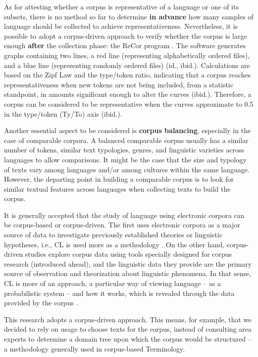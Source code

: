 \documentclass[english]{textolivre}
\begin{document}
As for attesting whether a corpus is representative of a language or one of its subsets, there is no method so far to determine \textbf{in advance} how many samples of language should be collected to achieve representativeness. Nevertheless, it is possible to adopt a corpus-driven approach to verify whether the corpus is large enough \textbf{after} the collection phase: the ReCor program \cite{seghiri_too_2014}. The software generates graphs containing two lines, a red line (representing alphabetically ordered files), and a blue line (representing randomly ordered files) (id., ibid.). Calculations are based on the Zipf Law and the type/token ratio, indicating that a corpus reaches representativeness when new tokens are not being included, from a statistic standpoint, in amounts significant enough to alter the curves (ibid.). Therefore, a corpus can be considered to be representative when the curves approximate to 0.5 in the type/token (Ty/To) axis (ibid.).

Another essential aspect to be considered is \textbf{corpus balancing}, especially in the case of comparable corpora. A balanced comparable corpus usually has a similar number of tokens, similar text typologies, genres, and linguistic varieties across languages \cite{sardinha_linguistica_2004,teixeira_linguistica_2008} to allow comparisons. It might be the case that the size and typology of texts vary among languages and/or among cultures within the same language. However, the departing point in building a comparable corpus is to look for similar textual features across languages when collecting texts to build the corpus.

It is generally accepted that the study of language using electronic corpora can be corpus-based or corpus-driven. The first uses electronic corpora as a major source of data to investigate previously established theories or linguistic hypotheses, i.e., CL is used more as a methodology \cites[p.~1084]{tagnin_producao_2009}[p.~5-6]{mcenery_corpus_2012}. On the other hand, corpus-driven studies explore corpus data using tools specially designed for corpus research (introduced ahead), and the linguistic data they provide are the primary source of observation and theorization about linguistic phenomena. In that sense, CL is more of an approach, a particular way of viewing language – as a probabilistic system – and how it works, which is revealed through the data provided by the corpus \cites[p.~1084]{tagnin_producao_2009}[p.~6]{mcenery_corpus_2012}.

This research adopts a corpus-driven approach. This means, for example, that we decided to rely on usage to choose texts for the corpus, instead of consulting area experts to determine a domain tree upon which the corpus would be structured – a methodology generally used in corpus-based Terminology.
\end{document}
